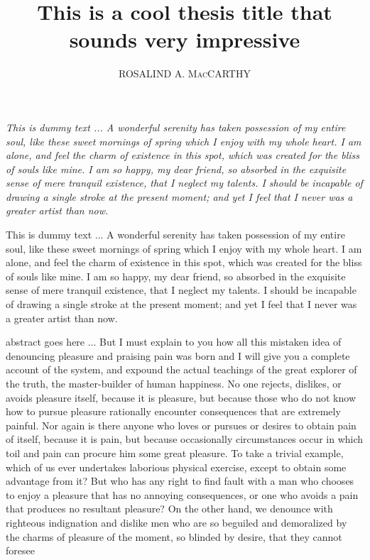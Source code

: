 \documentclass[letterpaper,oneside,11pt]{book}
\title{This is a cool thesis title that sounds very impressive}
\author{\textsc{ROSALIND A. MacCARTHY}}
\begin{document}
	\copyrightfalse

	\beforepreface

	\clearpage
	\thispagestyle{empty}
	\begin{dedication}
 		\begin{center}
 			\begin{minipage}[c]{3in}
 				\emph{%
 					This is dummy text ... A wonderful serenity has taken possession of my entire soul, like these sweet mornings of spring which I enjoy with my whole heart. I am alone, and feel the charm of existence in this spot, which was created for the bliss of souls like mine. I am so happy, my dear friend, so absorbed in the exquisite sense of mere tranquil existence, that I neglect my talents. I should be incapable of drawing a single stroke at the present moment; and yet I feel that I never was a greater artist than now.
 				}
 			\end{minipage}
 		\end{center}
	\end{dedication}

		This is dummy text ... A wonderful serenity has taken possession of my entire soul, like these sweet mornings of spring which I enjoy with my whole heart. I am alone, and feel the charm of existence in this spot, which was created for the bliss of souls like mine. I am so happy, my dear friend, so absorbed in the exquisite sense of mere tranquil existence, that I neglect my talents. I should be incapable of drawing a single stroke at the present moment; and yet I feel that I never was a greater artist than now.

 		abstract goes here ... But I must explain to you how all this mistaken idea of denouncing pleasure and praising pain was born and I will give you a complete account of the system, and expound the actual teachings of the great explorer of the truth, the master-builder of human happiness. No one rejects, dislikes, or avoids pleasure itself, because it is pleasure, but because those who do not know how to pursue pleasure rationally encounter consequences that are extremely painful. Nor again is there anyone who loves or pursues or desires to obtain pain of itself, because it is pain, but because occasionally circumstances occur in which toil and pain can procure him some great pleasure. To take a trivial example, which of us ever undertakes laborious physical exercise, except to obtain some advantage from it? But who has any right to find fault with a man who chooses to enjoy a pleasure that has no annoying consequences, or one who avoids a pain that produces no resultant pleasure? On the other hand, we denounce with righteous indignation and dislike men who are so beguiled and demoralized by the charms of pleasure of the moment, so blinded by desire, that they cannot foresee
\end{document}
